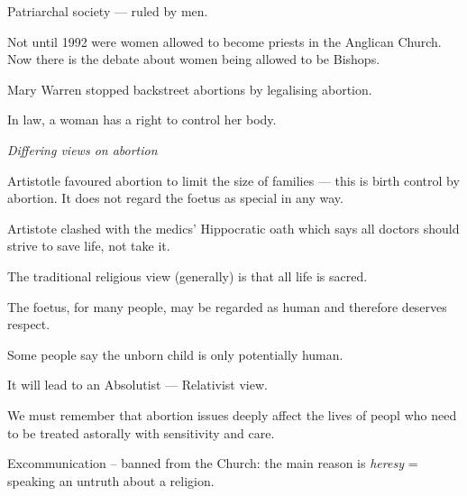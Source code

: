 \documentclass{article}
\begin{document}
Patriarchal society --- ruled by men.

Not until 1992 were women allowed to become priests in the Anglican Church.  Now there is the debate about women being allowed to be Bishops.

Mary Warren stopped backstreet abortions by legalising abortion.

In law, a woman has a right to control her body.

\textit{Differing views on abortion}

Artistotle favoured abortion to limit the size of families --- this is birth control by abortion.  It does not regard the foetus as special in any way.

Artistote clashed with the medics' Hippocratic oath which says all doctors should strive to save life, not take it.

The traditional religious view (generally) is that all life is sacred.

The foetus, for many people, may be regarded as human and therefore deserves respect.

Some people say the unborn child is only potentially human.

It will lead to an Absolutist --- Relativist view.

We must remember that abortion issues deeply affect the lives of peopl who need to be treated astorally with sensitivity and care.

Excommunication -- banned from the Church: the main reason is \textsl{heresy} = speaking an untruth about a religion.
\end{document}
